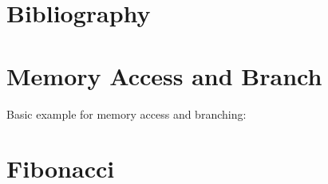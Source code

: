 \documentclass[adraft]{eptcs}
\begin{document}

	\newpage
	\section{Bibliography}
		
		
	\newpage
	
	\begin{appendices}
		\newpage
		\section{Memory Access and Branch}
			\label{app:simple}
			Basic example for memory access and branching:
			
		
		\newpage
		\section{Fibonacci}
			\label{app:fib}
			
	\end{appendices}
	
\end{document}
